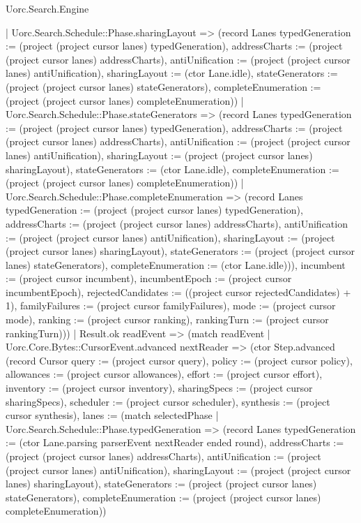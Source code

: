 \begin{lexlean}{Uorc.Search.Engine}
\begin{semanticmodule}
{{          | Uorc.Search.Schedule::Phase.sharingLayout => (record Lanes {typedGeneration := (project (project cursor lanes) typedGeneration), addressCharts := (project (project cursor lanes) addressCharts), antiUnification := (project (project cursor lanes) antiUnification), sharingLayout := (ctor Lane.idle), stateGenerators := (project (project cursor lanes) stateGenerators), completeEnumeration := (project (project cursor lanes) completeEnumeration)})
          | Uorc.Search.Schedule::Phase.stateGenerators => (record Lanes {typedGeneration := (project (project cursor lanes) typedGeneration), addressCharts := (project (project cursor lanes) addressCharts), antiUnification := (project (project cursor lanes) antiUnification), sharingLayout := (project (project cursor lanes) sharingLayout), stateGenerators := (ctor Lane.idle), completeEnumeration := (project (project cursor lanes) completeEnumeration)})
          | Uorc.Search.Schedule::Phase.completeEnumeration => (record Lanes {typedGeneration := (project (project cursor lanes) typedGeneration), addressCharts := (project (project cursor lanes) addressCharts), antiUnification := (project (project cursor lanes) antiUnification), sharingLayout := (project (project cursor lanes) sharingLayout), stateGenerators := (project (project cursor lanes) stateGenerators), completeEnumeration := (ctor Lane.idle)})), incumbent := (project cursor incumbent), incumbentEpoch := (project cursor incumbentEpoch), rejectedCandidates := ((project cursor rejectedCandidates) + 1), familyFailures := (project cursor familyFailures), mode := (project cursor mode), ranking := (project cursor ranking), rankingTurn := (project cursor rankingTurn)}))
        | Result.ok readEvent => (match readEvent
          | Uorc.Core.Bytes::CursorEvent.advanced nextReader => (ctor Step.advanced (record Cursor {query := (project cursor query), policy := (project cursor policy), allowances := (project cursor allowances), effort := (project cursor effort), inventory := (project cursor inventory), sharingSpecs := (project cursor sharingSpecs), scheduler := (project cursor scheduler), synthesis := (project cursor synthesis), lanes := (match selectedPhase
            | Uorc.Search.Schedule::Phase.typedGeneration => (record Lanes {typedGeneration := (ctor Lane.parsing parserEvent nextReader ended round), addressCharts := (project (project cursor lanes) addressCharts), antiUnification := (project (project cursor lanes) antiUnification), sharingLayout := (project (project cursor lanes) sharingLayout), stateGenerators := (project (project cursor lanes) stateGenerators), completeEnumeration := (project (project cursor lanes) completeEnumeration)})
}}
\end{semanticmodule}
\end{lexlean}
